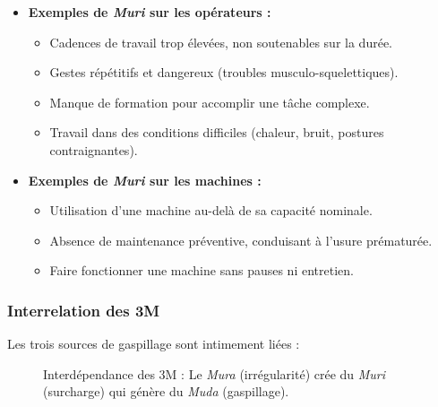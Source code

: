\documentclass[a4paper,12pt]{article}
\begin{document}
\begin{itemize}
    \item \textbf{Exemples de \textit{Muri} sur les opérateurs :}
    \begin{itemize}
        \item Cadences de travail trop élevées, non soutenables sur la durée.
        \item Gestes répétitifs et dangereux (troubles musculo-squelettiques).
        \item Manque de formation pour accomplir une tâche complexe.
        \item Travail dans des conditions difficiles (chaleur, bruit, postures contraignantes).
    \end{itemize}
    \item \textbf{Exemples de \textit{Muri} sur les machines :}
    \begin{itemize}
        \item Utilisation d'une machine au-delà de sa capacité nominale.
        \item Absence de maintenance préventive, conduisant à l'usure prématurée.
        \item Faire fonctionner une machine sans pauses ni entretien.
    \end{itemize}
\end{itemize}

\subsubsection{Interrelation des 3M}

Les trois sources de gaspillage sont intimement liées :

\begin{figure}[h!]
\centering
{}
\caption{Interdépendance des 3M : Le \textit{Mura} (irrégularité) crée du \textit{Muri} (surcharge) qui génère du \textit{Muda} (gaspillage).}
\label{fig:3m}
\end{figure}
\end{document}
